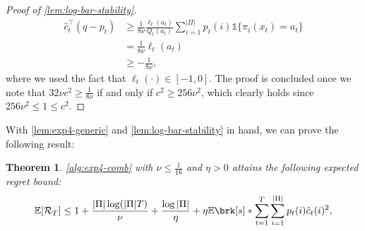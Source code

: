 \documentclass[11pt]{article}
\renewcommand{\ind}[1]{\mathds{1}\{#1\}}
\newcommand{\bbE}{\boldsymbol{\mathbb{E}}}
\renewcommand{\E}{\bbE}
\newcommand{\pred}{a}
\newcommand{\regret}{\mathcal{R}}
\theoremstyle{plain}
\newtheorem{theorem}{Theorem}
\begin{document}
\begin{proof}[Proof of \cref{lem:log-bar-stability}]
    \begin{align*}
        \hat c_t^\top (q-p_t)
        &\geq
        \frac{1}{8\nu} \frac{\ell_t(\pred_t)}{Q_t(\pred_t)} \sum_{i=1}^{|\Pi|} p_t(i) \ind{\pi_i(x_t)=\pred_t} \\
        &=
        \frac{1}{8\nu} \ell_t(\pred_t) \\
        &\geq - \frac{1}{8\nu},
    \end{align*}
    where we used the fact that $\ell_t(\cdot) \in [-1,0]$. The proof is concluded once we note that $32 \nu c^2 \geq \frac{1}{8\nu}$ if and only if $c^2 \geq 256 \nu^2$, which clearly holds since $256 \nu^2 \leq 1 \leq c^2$.
\end{proof}
With \cref{lem:exp4-generic} and \cref{lem:log-bar-stability} in hand, we can prove the following result:

\begin{theorem}
\label{thm:exp4-prelim}
    \cref{alg:exp4-comb} with $\nu \leq \frac{1}{16}$ and $\eta > 0$ attains the following expected regret bound:
    \begin{align*}
        \E[\regret_T] \leq 1 + \frac{|\Pi| \log (|\Pi|T)}{\nu} + \frac{\log |\Pi|}{\eta} + \eta \E \brk[s]*{\sum_{t=1}^T \sum_{i=1}^{|\Pi|}  p_t(i)\hat c_t(i)^2},
    \end{align*}
\end{theorem}
\end{document}
